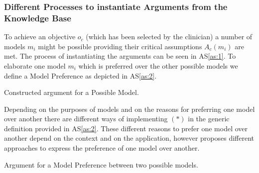 \subsubsection*{Different Processes to instantiate Arguments from the Knowledge Base}

To achieve an objective $o_c$ (which has been selected by the clinician) a number of models $m_i$ might be possible providing their critical assumptions $A_c(m_i)$ are met. The process of instantiating the arguments can be seen in AS\autoref{as:1}. To elaborate one model $m_i$ which is preferred over the other possible models we define a Model Preference as depicted in AS\ref{as:2}.

\begin{AS}[h]
\centering
	\caption{Constructed argument for a Possible Model.\label{as:1}}
\end{AS}

Depending on the purposes of models and on the reasons for preferring one model over another there are different ways of implementing $(\ast)$ in the generic definition provided in AS\ref{as:2}. These different reasons to prefer one model over another depend on the context and on the application, however \cite{sassoon2014} proposes different approaches to express the preference of one model over another.  

\begin{AS}[h]
\centering
	\caption{Argument for a Model Preference between two possible models.\label{as:2} }

\end{AS}

